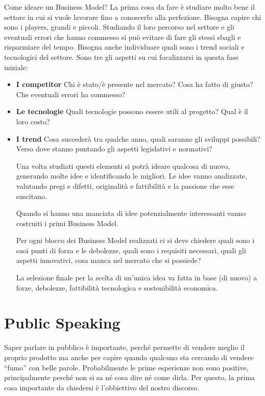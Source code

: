 Come ideare un Business Model? La prima cosa da fare è studiare molto bene il
settore in cui si vuole lavorare fino a conoscerlo alla perfezione.
Bisogna capire chi sono i players, grandi e piccoli. Studiando il loro
percorso nel settore e gli eventuali errori che hanno commesso si può
evitare di fare gli stessi sbagli e risparmiare del tempo. Bisogna anche
individuare quali sono i trend sociali e tecnologici del settore.
Sono tre gli aspetti su cui focalizzarsi in questa fase iniziale:

\begin{itemize}

\item \textbf{I competitor} Chi è stato/è presente nel mercato?
Cosa ha fatto di giusto? Che eventuali errori ha commesso?

\item \textbf{Le tecnologie} Quali tecnologie possono essere utili al progetto?
Qual è il loro costo?

\item \textbf{I trend} Cosa succederà tra qualche anno, quali saranno gli
sviluppi possibili? Verso dove stanno puntando gli aspetti legislativi e
normativi?

Una volta studiati questi elementi si potrà ideare qualcosa di nuovo,
generando molte idee e identificando le migliori.
Le idee vanno analizzate, valutando pregi e difetti, originalità e
fattibilità e la passione che esse suscitano.

Quando si hanno una manciata di idee potenzialmente interessanti vanno
costruiti i primi Business Model.

Per ogni blocco dei Business Model realizzati ci si deve chiedere quali
sono i suoi punti di forza e le debolezze, quali sono i requisiti
necessari, quali gli aspetti innovativi, cosa manca nel mercato che si
possiede?

La selezione finale per la scelta di un'unica idea va fatta in base
(di nuovo) a forze, debolezze, fattibilità tecnologica e sostenibilità
economica.

\end{itemize}

\chapter{Public Speaking}

Saper parlare in pubblico è importante, perché permette di vendere meglio il
proprio prodotto ma anche per capire quando qualcuno sta cercando di vendere
``fumo'' con belle parole. Probabilmente le prime esperienze non sono positive,
principalmente perché non si sa né cosa dire né come dirla. Per questo, la
prima cosa importante da chiedersi è l'obbiettivo del nostro discorso.

